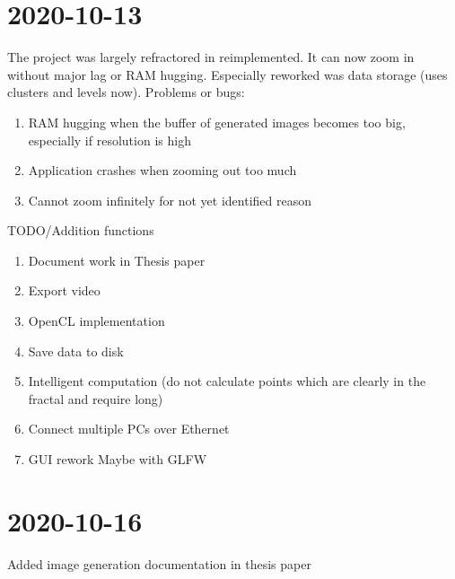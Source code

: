 \documentclass[10pt,a4paper]{article}
\begin{document}
	\section{2020-10-13}
	The project was largely refractored in reimplemented. It can now zoom in without major lag or RAM hugging. Especially reworked was data storage (uses clusters and levels now). Problems or bugs:
	\begin{enumerate}
		\item RAM hugging when the buffer of generated images becomes too big, especially if resolution is high
		\item Application crashes when zooming out too much
		\item Cannot zoom infinitely for not yet identified reason 
	\end{enumerate}
	TODO/Addition functions
	\begin{enumerate}
		\item Document work in Thesis paper
		\item Export video
		\item OpenCL implementation
		\item Save data to disk
		\item Intelligent computation (do not calculate points which are clearly in the fractal and require long)
		\item Connect multiple PCs over Ethernet
		\item GUI rework
		\subitem Maybe with GLFW
	\end{enumerate}

	\section{2020-10-16}
	Added image generation documentation in thesis paper
\end{document}

